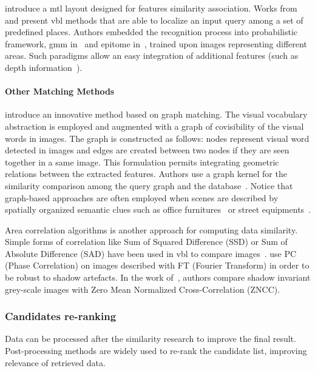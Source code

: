 \citet{Lu2015} introduce a \ac{mtl} layout designed for features similarity association. Works from \citet{torralba2003context} and \citet{Ni2009} present \ac{vbl} methods that are able to localize an input query among a set of predefined places. Authors embedded the recognition process into probabilistic framework, \ac{gmm} in~\citep{torralba2003context} and epitome in~\citep{Ni2009}, trained upon images representing different areas. Such paradigms allow an easy integration of additional features (such as depth information~\citep{Ni2009}).

\paragraph{Other Matching Methods}
\citet{Stumm2015a} introduce an innovative method based on graph matching. The visual vocabulary abstraction is employed and augmented with a graph of covisibility of the visual words in images. The graph is constructed as follows: nodes represent visual word detected in images and edges are created between two nodes if they are seen together in a same image. This formulation permits integrating geometric relations between the extracted features. Authors use a graph kernel for the similarity comparison among the query graph and the database~\citep{Stumm2015,Stumm2016}. Notice that graph-based approaches are often employed when scenes are described by spatially organized semantic clues such as office furnitures~\citep{Salas-Moreno2013} or street equipments~\citep{Ardeshir2014}.

Area correlation algorithms is another approach for computing data similarity. Simple forms of correlation like Sum of Squared Difference (SSD) or Sum of Absolute Difference (SAD) have been used in \ac{vbl} to compare images~\citep{Poglitsch2015,Milford2015}. \citet{Wan2016} use PC (Phase Correlation) on images described with FT (Fourier Transform) in order to be robust to shadow artefacts. In the work of~\citep{Corke2013}, authors compare shadow invariant grey-scale images with Zero Mean Normalized Cross-Correlation (ZNCC).


\subsubsection{Candidates re-ranking}
\label{subsec:candidates_re_ranking}
Data can be processed after the similarity research to improve the final result. Post-processing methods are widely used to re-rank the candidate list, improving relevance of retrieved data.

